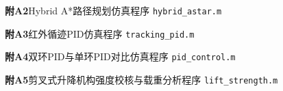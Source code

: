 \noindent \textbf{附A2}\quad Hybrid A*路径规划仿真程序 \texttt{hybrid\_astar.m}



\vspace{1em}

\noindent \textbf{附A3}\quad 红外循迹PID仿真程序 \texttt{tracking\_pid.m}



\vspace{1em}

\noindent \textbf{附A4}\quad 双环PID与单环PID对比仿真程序 \texttt{pid\_control.m}



\vspace{1em}

\noindent \textbf{附A5}\quad 剪叉式升降机构强度校核与载重分析程序 \texttt{lift\_strength.m}





